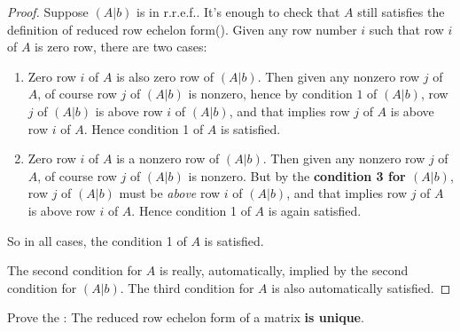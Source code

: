 \begin{proof}
Suppose \((A|b)\) is in r.r.e.f..
It's enough to check that \(A\) still satisfies the definition of reduced row echelon form().
Given any row number \(i\) such that row \(i\) of \(A\) is zero row, there are two cases:
\begin{enumerate}
\item Zero row \(i\) of \(A\) is also zero row of \((A|b)\).
    Then given any nonzero row \(j\) of \(A\), of course row \(j\) of \((A|b)\) is nonzero, hence by condition \(1\) of \((A|b)\),
    row \(j\) of \((A|b)\) is above row \(i\) of \((A|b)\), and that implies row \(j\) of \(A\) is above row \(i\) of \(A\).
    Hence condition 1 of \(A\) is satisfied.
\item Zero row \(i\) of \(A\) is a nonzero row of \((A|b)\).
    Then given any nonzero row \(j\) of \(A\), of course row \(j\) of \((A|b)\) is nonzero.
    But by the \textbf{condition 3 for \((A|b)\)}, row \(j\) of \((A|b)\) must be \emph{above} row \(i\) of \((A|b)\), and that implies row \(j\) of \(A\) is above row \(i\) of \(A\).
    Hence condition 1 of \(A\) is again satisfied.
\end{enumerate}
So in all cases, the condition 1 of \(A\) is satisfied.

The second condition for \(A\) is really, automatically, implied by the second condition for \((A|b)\).
The third condition for \(A\) is also automatically satisfied.
\end{proof}

\begin{exercise} \label{exercise 3.4.15}
Prove the :
The reduced row echelon form of a matrix \textbf{is unique}.
\end{exercise}

